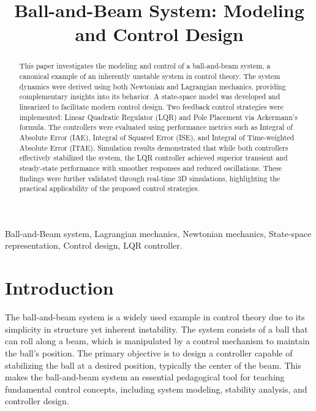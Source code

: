 \documentclass[conference]{IEEEtran}
\begin{document}
\title{Ball-and-Beam System: Modeling and Control Design}

\author{
}

\maketitle

\begin{abstract}
    This paper investigates the modeling and control of a ball-and-beam system, a canonical example of an inherently unstable system in control theory. The system dynamics were derived using both Newtonian and Lagrangian mechanics, providing complementary insights into its behavior. A state-space model was developed and linearized to facilitate modern control design. Two feedback control strategies were implemented: Linear Quadratic Regulator (LQR) and Pole Placement via Ackermann’s formula. The controllers were evaluated using performance metrics such as Integral of Absolute Error (IAE), Integral of Squared Error (ISE), and Integral of Time-weighted Absolute Error (ITAE). Simulation results demonstrated that while both controllers effectively stabilized the system, the LQR controller achieved superior transient and steady-state performance with smoother responses and reduced oscillations. These findings were further validated through real-time 3D simulations, highlighting the practical applicability of the proposed control strategies.
\end{abstract}


\begin{IEEEkeywords}
Ball-and-Beam system, Lagrangian mechanics, Newtonian mechanics, State-space representation, Control design, LQR controller.
\end{IEEEkeywords}

\section{Introduction}
\label{sec:intro}
The ball-and-beam system is a widely used example in control theory due to its simplicity in structure yet inherent instability. The system consists of a ball that can roll along a beam, which is manipulated by a control mechanism to maintain the ball's position. The primary objective is to design a controller capable of stabilizing the ball at a desired position, typically the center of the beam. This makes the ball-and-beam system an essential pedagogical tool for teaching fundamental control concepts, including system modeling, stability analysis, and controller design.
\end{document}
